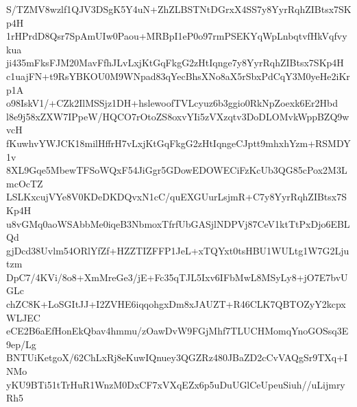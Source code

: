 S/TZMV8wzlf1QJV3DSgK5Y4uN+ZhZLBSTNtDGrxX4SS7y8YyrRqhZIBtsx7SKp4H
1rHPrdD8Qsr7SpAmUIw0Paou+MRBpI1eP0o97rmPSEKYqWpLnbqtvfHkVqfvykua
ji435mFksFJM20MavFfhJLvLxjKtGqFkgG2zHtIqnge7y8YyrRqhZIBtsx7SKp4H
c1uajFN+t9RsYBKOU0M9WNpad83qYecBhsXNo8aX5rSbxPdCqY3M0yeHe2iKrp1A
o98IskV1/+CZk2IlMSSjz1DH+hslewoofTVLcyuz6b3ggio0RkNpZoexk6Er2Hbd
l8e9j58xZXW7IPpeW/HQCO7rOtoZS8oxvYIi5zVXzqtv3DoDLOMvkWppBZQ9wvcH
fKuwhvYWJCK18milHffrH7vLxjKtGqFkgG2zHtIqngeCJptt9mhxhYzm+RSMDY1v
8XL9Gqe5MbewTFSoWQxF54JiGgr5GDowEDOWECiFzKcUb3QG85cPox2M3LmcOcTZ
LSLKxcujVYe8V0KDeDKDQvxN1cC/quEXGUurLsjmR+C7y8YyrRqhZIBtsx7SKp4H
u8vGMq0aoWSAbbMe0iqeB3NbmoxTfrfUbGASjlNDPVj87CeV1ktTtPxDjo6EBLQd
gjDcd38Uvlm54ORlYfZf+HZZTIZFFP1JeL+xTQYxt0tsHBU1WULtg1W7G2Ljutzm
DpC7/4KVi/8o8+XmMreGe3/jE+Fc35qTJL5Ixv6IFbMwL8MSyLy8+jO7E7bvUGLc
chZC8K+LoSGItJJ+I2ZVHE6iqqohgxDm8xJAUZT+R46CLK7QBTOZyY2kcpxWLJEC
eCE2B6aEfHonEkQbav4hmmu/zOawDvW9FGjMhf7TLUCHMomqYnoGOSsq3E9ep/Lg
BNTUiKetgoX/62ChLxRj8eKuwIQnuey3QGZRz480JBaZD2cCvVAQgSr9TXq+INMo
yKU9BTi51tTrHuR1WnzM0DxCF7xVXqEZx6p5uDuUGlCeUpeuSiuh//uLijmryRh5
